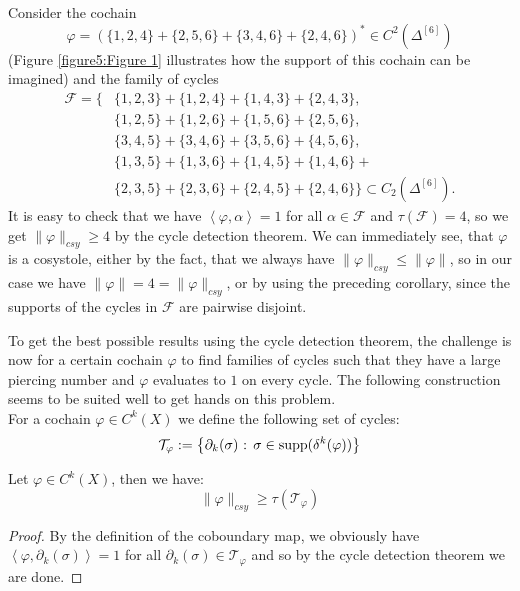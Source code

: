 \begin{expl}\label{example1a}
Consider the cochain
\[
\varphi=\left(\{1,2,4\}+\{2,5,6\}+\{3,4,6\}+\{2,4,6\}\right)^*\in C^2(\Delta^{[6]})
\]
(Figure \ref{figure5:Figure 1} illustrates how the support of this cochain can be imagined) and the family of cycles
\begin{align*}
\mathcal{F}=\{&\{1,2,3\}+\{1,2,4\}+\{1,4,3\}+\{2,4,3\},\\
&\{1,2,5\}+\{1,2,6\}+\{1,5,6\}+\{2,5,6\},\\
&\{3,4,5\}+\{3,4,6\}+\{3,5,6\}+\{4,5,6\},\\
&\{1,3,5\}+\{1,3,6\}+\{1,4,5\}+\{1,4,6\}+\\
&\{2,3,5\}+\{2,3,6\}+\{2,4,5\}+\{2,4,6\}\}\subset C_2(\Delta^{[6]}).
\end{align*}
It is easy to check that we have \(\left\langle\varphi,\alpha\right\rangle=1\) for all \(\alpha\in\mathcal{F}\) and \(\tau(\mathcal{F})=4\), so we get \(\|\varphi\|_{csy}\geq 4\) by the cycle detection theorem. We can immediately see, that \(\varphi\) is a cosystole, either by the fact, that we always have \(\|\varphi\|_{csy}\leq \|\varphi\|\), so in our case we have \(\|\varphi\|=4=\|\varphi\|_{csy}\), or by using the preceding corollary, since the supports of the cycles in \(\mathcal{F}\) are pairwise disjoint.
\end{expl}



To get the best possible results using the cycle detection theorem, the challenge is now for a certain cochain \(\varphi\) to find families of cycles such that they have a large piercing number and \(\varphi\) evaluates to \(1\) on every cycle. The following construction seems to be suited well to get hands on this problem.\\
For a cochain \(\varphi\in C^k(X)\) we define the following set of cycles:
\[
\mathcal{T}_{\varphi}:=\left\{\partial_k(\sigma)\text{ : }\sigma\in \mathrm{supp}(\delta^k(\varphi))\right\}
\]

\begin{prop}
Let \(\varphi\in C^k(X)\), then we have:
\[
\|\varphi\|_{csy}\geq\tau(\mathcal{T}_{\varphi})
\]
\begin{proof}
By the definition of the coboundary map, we obviously have\\
\(\left\langle\varphi,\partial_k(\sigma)\right\rangle=1\) for all \(\partial_k(\sigma)\in\mathcal{T}_{\varphi}\) and so by the cycle detection theorem we are done.
\end{proof}
\end{prop}

